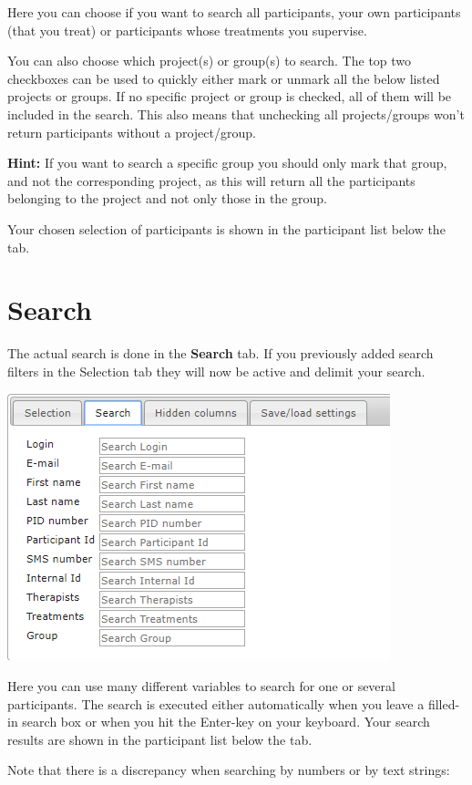 \documentclass[]{book}
\begin{document}
Here you can choose if you want to search all participants, your own participants (that you treat) or participants whose treatments you supervise.

You can also choose which project(s) or group(s) to search. The top two checkboxes can be used to quickly either mark or unmark all the below listed projects or groups. If no specific project or group is checked, all of them will be included in the search. This also means that unchecking all projects/groups won't return participants without a project/group.

\textbf{Hint:} If you want to search a specific group you should only mark that group, and not the corresponding project, as this will return all the participants belonging to the project and not only those in the group.

Your chosen selection of participants is shown in the participant list below the tab.

\hypertarget{search}{%
\section{Search}\label{search}}

The actual search is done in the \textbf{Search} tab. If you previously added search filters in the Selection tab they will now be active and delimit your search.

\includegraphics{images/search.png}

Here you can use many different variables to search for one or several participants. The search is executed either automatically when you leave a filled-in search box or when you hit the Enter-key on your keyboard. Your search results are shown in the participant list below the tab.

Note that there is a discrepancy when searching by numbers or by text strings:
\end{document}
